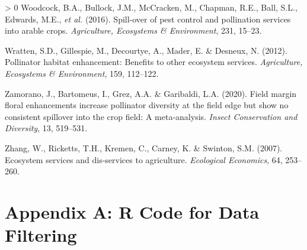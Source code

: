 \documentclass[]{elsarticle} %
\newlength{\cslhangindent}
\newenvironment{CSLReferences}[3] %
 {%
  \setlength{\parindent}{0pt}
  \ifodd #1 \everypar{\setlength{\hangindent}{\cslhangindent}}\ignorespaces\fi
  \ifnum #2 > 0
  \setlength{\parskip}{#2\baselineskip}
  \fi
 }%
 {}
\begin{document}
\begin{CSLReferences}{1}{0}
\leavevmode\hypertarget{ref-woodcock2016}{}%
Woodcock, B.A., Bullock, J.M., McCracken, M., Chapman, R.E., Ball, S.L., Edwards, M.E., \emph{et al.} (2016). Spill-over of pest control and pollination services into arable crops. \emph{Agriculture, Ecosystems \& Environment}, 231, 15--23.

\leavevmode\hypertarget{ref-wratten2012}{}%
Wratten, S.D., Gillespie, M., Decourtye, A., Mader, E. \& Desneux, N. (2012). Pollinator habitat enhancement: Benefits to other ecosystem services. \emph{Agriculture, Ecosystems {\&} Environment}, 159, 112--122.

\leavevmode\hypertarget{ref-zamorano2020}{}%
Zamorano, J., Bartomeus, I., Grez, A.A. \& Garibaldi, L.A. (2020). Field margin floral enhancements increase pollinator diversity at the field edge but show no consistent spillover into the crop field: A meta-analysis. \emph{Insect Conservation and Diversity}, 13, 519--531.

\leavevmode\hypertarget{ref-zhang2007}{}%
Zhang, W., Ricketts, T.H., Kremen, C., Carney, K. \& Swinton, S.M. (2007). Ecosystem services and dis-services to agriculture. \emph{Ecological Economics}, 64, 253--260.

\end{CSLReferences}

\singlespacing
\nolinenumbers

\newpage

\hypertarget{appendix-a-r-code-for-data-filtering}{%
\section*{Appendix A: R Code for Data Filtering}\label{appendix-a-r-code-for-data-filtering}}
\end{document}
